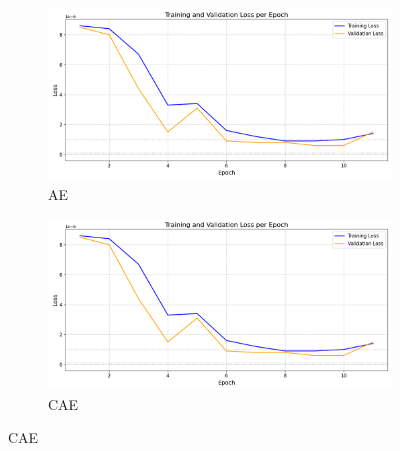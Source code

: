 \begin{figure}[!htbp]
  \centering
  \begin{subfigure}[t]{.6\textwidth}
    \centering
    \includegraphics[width=\linewidth]{figures/losses/ae.png}
    \caption{AE}
  \end{subfigure}
  \hfill
  \begin{subfigure}[t]{.6\textwidth}
    \centering
    \includegraphics[width=\linewidth]{figures/losses/ae.png}
    \caption{CAE}
  \end{subfigure}
  
  \vspace{1cm}
  

\end{figure}
